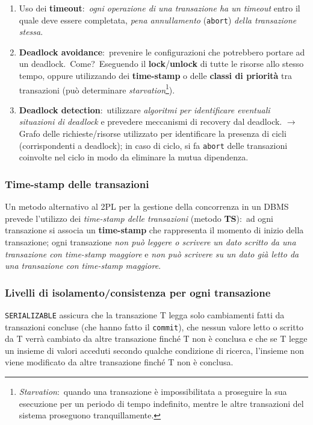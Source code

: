 \begin{enumerate}
	\item Uso dei \textbf{timeout}:\ \textit{ogni operazione di una transazione ha un timeout} entro il quale deve essere completata, \textit{pena annullamento} (\texttt{abort}) \textit{della transazione stessa}.
	\item \textbf{Deadlock avoidance}:\ prevenire le configurazioni che potrebbero portare ad un deadlock.\ Come?\ Eseguendo il \textbf{lock}/\textbf{unlock} di tutte le risorse allo stesso tempo, oppure utilizzando dei \textbf{time-stamp} o delle \textbf{classi di priorità} tra transazioni (può determinare \textit{starvation}\footnote{\textit{Starvation}:\ quando una transazione è impossibilitata a proseguire la sua esecuzione per un periodo di tempo indefinito, mentre le altre transazioni del sistema proseguono tranquillamente.}).
	\item\textbf{Deadlock detection}:\ utilizzare \textit{algoritmi per identificare eventuali situazioni di deadlock} e prevedere meccanismi di recovery dal deadlock. $\rightarrow$ Grafo delle richieste/risorse utilizzato per identificare la presenza di cicli (corrispondenti a deadlock); in caso di ciclo, si fa \texttt{abort} delle transazioni coinvolte nel ciclo in modo da eliminare la mutua dipendenza.\
\end{enumerate}

\subsubsection{Time-stamp delle transazioni}

Un metodo alternativo al 2PL per la gestione della concorrenza in un DBMS prevede l'utilizzo dei \textit{time-stamp delle transazioni} (metodo \textbf{TS}):\ ad ogni transazione si associa un \textbf{time-stamp} che rappresenta il momento di inizio della transazione; ogni transazione \textit{non può leggere o scrivere un dato scritto da una transazione con time-stamp maggiore} e \textit{non può scrivere su un dato già letto da una transazione con time-stamp maggiore}.

\subsubsection{Livelli di isolamento/consistenza per ogni transazione}

\texttt{SERIALIZABLE} assicura che la transazione T legga solo cambiamenti fatti da transazioni concluse (che hanno fatto il \texttt{commit}), che nessun valore letto o scritto da T verrà cambiato da altre transazione finché T non è conclusa e che se T legge un insieme di valori acceduti secondo qualche condizione di ricerca, l'insieme non viene modificato da altre transazione finché T non è conclusa.\

